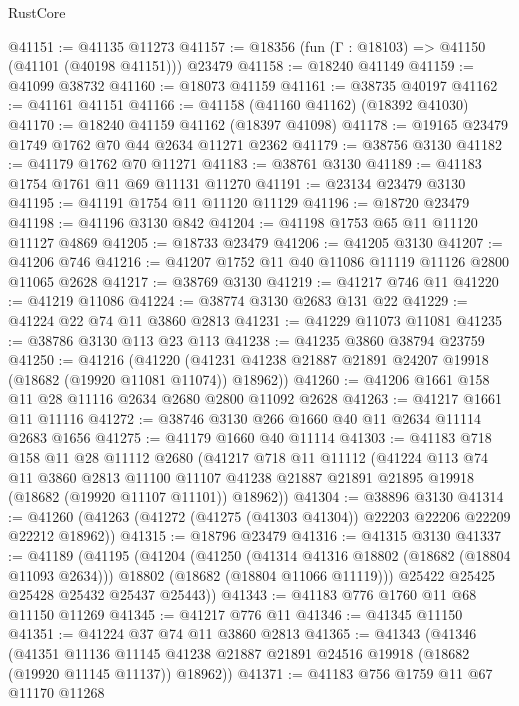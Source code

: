 \begin{lexlean}{RustCore}
\begin{coremodule}
@41151 := @41135 @11273
@41157 := @18356 (fun (Γ : @18103) => @41150 (@41101 (@40198 @41151))) @23479
@41158 := @18240 @41149
@41159 := @41099 @38732
@41160 := @18073 @41159
@41161 := @38735 @40197
@41162 := @41161 @41151
@41166 := @41158 (@41160 @41162) (@18392 @41030)
@41170 := @18240 @41159 @41162 (@18397 @41098)
@41178 := @19165 @23479 @1749 @1762 @70 @44 @2634 @11271 @2362
@41179 := @38756 @3130
@41182 := @41179 @1762 @70 @11271
@41183 := @38761 @3130
@41189 := @41183 @1754 @1761 @11 @69 @11131 @11270
@41191 := @23134 @23479 @3130
@41195 := @41191 @1754 @11 @11120 @11129
@41196 := @18720 @23479
@41198 := @41196 @3130 @842
@41204 := @41198 @1753 @65 @11 @11120 @11127 @4869
@41205 := @18733 @23479
@41206 := @41205 @3130
@41207 := @41206 @746
@41216 := @41207 @1752 @11 @40 @11086 @11119 @11126 @2800 @11065 @2628
@41217 := @38769 @3130
@41219 := @41217 @746 @11
@41220 := @41219 @11086
@41224 := @38774 @3130 @2683 @131 @22
@41229 := @41224 @22 @74 @11 @3860 @2813
@41231 := @41229 @11073 @11081
@41235 := @38786 @3130 @113 @23 @113
@41238 := @41235 @3860 @38794 @23759
@41250 := @41216
    (@41220 (@41231 @41238 @21887 @21891 @24207 @19918 (@18682 (@19920 @11081 @11074)) @18962))
@41260 := @41206 @1661 @158 @11 @28 @11116 @2634 @2680 @2800 @11092 @2628
@41263 := @41217 @1661 @11 @11116
@41272 := @38746 @3130 @266 @1660 @40 @11 @2634 @11114 @2683 @1656
@41275 := @41179 @1660 @40 @11114
@41303 := @41183
    @718
    @158
    @11
    @28
    @11112
    @2680
    (@41217
      @718
      @11
      @11112
      (@41224
        @113
        @74
        @11
        @3860
        @2813
        @11100
        @11107
        @41238
        @21887
        @21891
        @21895
        @19918
        (@18682 (@19920 @11107 @11101))
        @18962))
@41304 := @38896 @3130
@41314 := @41260 (@41263 (@41272 (@41275 (@41303 @41304)) @22203 @22206 @22209 @22212 @18962))
@41315 := @18796 @23479
@41316 := @41315 @3130
@41337 := @41189
    (@41195
      (@41204
        (@41250
          (@41314 @41316 @18802 (@18682 (@18804 @11093 @2634)))
          @18802
          (@18682 (@18804 @11066 @11119)))
        @25422
        @25425
        @25428
        @25432
        @25437
        @25443))
@41343 := @41183 @776 @1760 @11 @68 @11150 @11269
@41345 := @41217 @776 @11
@41346 := @41345 @11150
@41351 := @41224 @37 @74 @11 @3860 @2813
@41365 := @41343
    (@41346
      (@41351
        @11136
        @11145
        @41238
        @21887
        @21891
        @24516
        @19918
        (@18682 (@19920 @11145 @11137))
        @18962))
@41371 := @41183 @756 @1759 @11 @67 @11170 @11268

\end{coremodule}
\end{lexlean}
